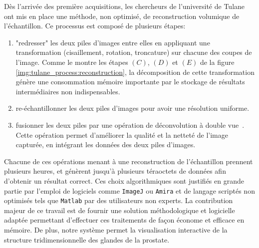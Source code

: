 {{	    Dès l'arrivée des première acquisitions, les chercheurs de l'université de Tulane ont mis en place une méthode, non optimisé, de reconstruction volumique de l'échantillon. %
	    Ce processus est composé de plusieurs étapes:
	    \begin{enumerate}
	    \item "redresser" les deux piles d'images entre elles en appliquant une transformation (cisaillement, rotation, troncature) sur chacune des coupes de l'image. Comme le montre les étapes $(C)$, $(D)$ et $(E)$ de la figure \ref{img:tulane_process:reconstruction}, la décomposition de cette transformation génère une consommation mémoire importante par le stockage de résultats intermédiaires non indispensables.
	    \item re-échantillonner les deux piles d'images pour avoir une résolution uniforme. %
	    \item fusionner les deux piles par une opération de déconvolution à double vue~\cite{cite_deconv_richardson_lucy, cite_deconv_spim_huisken}. Cette opération permet d'améliorer la qualité et la netteté de l'image capturée, en intégrant les données des deux piles d'images. 
	    \end{enumerate}
	    Chacune de ces opérations menant à une reconstruction de l'échantillon prennent plusieurs heures, et génèrent jusqu'à plusieurs téraoctets de données afin d'obtenir un résultat correct. Ces choix algorithmiques sont justifiés en grande partie par l'emploi de logiciels comme \texttt{ImageJ} ou \texttt{Amira} et de langage scriptés non optimisés tels que \texttt{Matlab} par des utilisateurs non experts. La contribution majeur de ce travail est de fournir une solution méthodologique et logicielle adaptée permettant d'effectuer ces traitements de façon économe et efficace en mémoire. De plus, notre système permet la visualisation interactive de la structure tridimensionnelle des glandes de la prostate.  %
	}
	    
}
